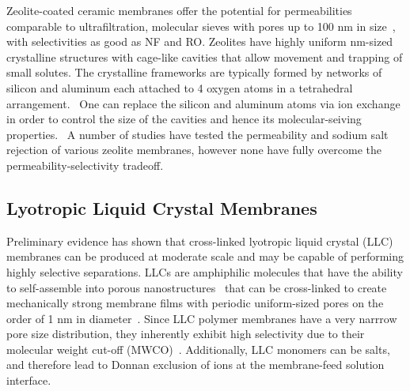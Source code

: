 \documentclass{article}
\begin{document}
  Zeolite-coated ceramic membranes offer the potential for permeabilities
  comparable to ultrafiltration, molecular sieves with pores up to 100 nm in 
  size~\cite{werber_materials_2016}, with selectivities as good as NF and RO. 
  Zeolites have highly uniform nm-sized crystalline structures with cage-like
  cavities that allow movement and trapping of small solutes. The crystalline
  frameworks are typically formed by networks of silicon and aluminum each 
  attached to 4 oxygen atoms in a tetrahedral arrangement.~\cite{auerbach_handbook_2003}
  One can replace the silicon and aluminum atoms via ion exchange in order to
  control the size of the cavities and hence its molecular-seiving properties.~\cite{li_novel_2007}
  A number of studies have tested the permeability and sodium salt rejection
  of various zeolite membranes, however none have fully overcome the 
  permeability-selectivity tradeoff.~\cite{pendergast_review_2011}

  \subsection*{Lyotropic Liquid Crystal Membranes}
  
  Preliminary evidence has shown that cross-linked lyotropic liquid crystal
  (LLC) membranes can be produced at moderate scale and may be capable of 
  performing highly selective separations. 
  LLCs are amphiphilic molecules 
  that have the ability to self-assemble into porous nanostructures~\cite{smith_ordered_1997}
  that can be cross-linked to create mechanically strong membrane films with 
  periodic uniform-sized pores on the order of 1 nm in diameter~\cite{zhou_supported_2005}. 
  Since LLC polymer membranes 
  have a very narrrow
  pore size distribution, they 
  inherently exhibit high selectivity due to their molecular weight cut-off 
  (MWCO)~\cite{zhou_supported_2005}. Additionally, LLC monomers can be salts,
  and therefore lead to Donnan exclusion of ions at the membrane-feed solution 
  interface.\cite{donnan_theory_1995}
\end{document}
